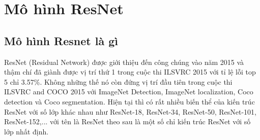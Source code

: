 \section{Mô hình ResNet}
\subsection{Mô hình Resnet là gì}
ResNet (Residual Network) được giới thiệu đến công chúng vào năm 2015 và thậm chí đã giành được vị trí thứ 1 trong cuộc thi ILSVRC 2015 với tỉ lệ lỗi top 5 chỉ 3.57\%. Không những thế nó còn đứng vị trí đầu tiên trong cuộc thi ILSVRC and COCO 2015 với ImageNet Detection, ImageNet localization, Coco detection và Coco segmentation. Hiện tại thì có rất nhiều biến thể của kiến trúc ResNet với số lớp khác nhau như ResNet-18, ResNet-34, ResNet-50, ResNet-101, ResNet-152,... với tên là ResNet theo sau là một số chỉ kiến trúc ResNet với số lớp nhất định.

